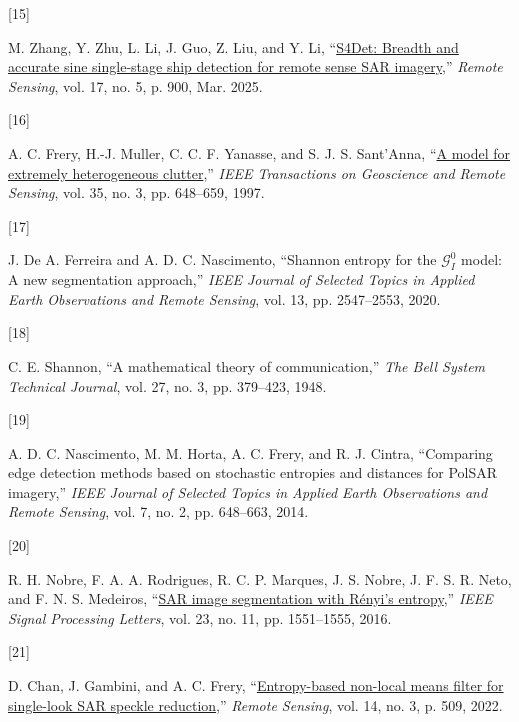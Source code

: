 \documentclass[
  lettersize  journal,
]{IEEEtran}%
\newlength{\cslhangindent}
\newlength{\csllabelwidth}
\newenvironment{CSLReferences}[2] %
 {\begin{list}{}{%
  \setlength{\itemindent}{0pt}
  \setlength{\leftmargin}{0pt}
  \setlength{\parsep}{0pt}
  \ifodd #1
   \setlength{\leftmargin}{\cslhangindent}
   \setlength{\itemindent}{-1\cslhangindent}
  \fi
  \setlength{\itemsep}{#2\baselineskip}}}
 {\end{list}}
\newcommand{\CSLLeftMargin}[1]{\parbox[t]{\csllabelwidth}{\strut#1\strut}}
\newcommand{\CSLRightInline}[1]{\parbox[t]{\linewidth - \csllabelwidth}{\strut#1\strut}}
\begin{document}
\begin{CSLReferences}{0}{0}
\CSLLeftMargin{{[}15{]} }%
\CSLRightInline{M. Zhang, Y. Zhu, L. Li, J. Guo, Z. Liu, and Y. Li,
{``\href{https://doi.org/10.3390/rs17050900}{{S4Det}: Breadth and
accurate sine single-stage ship detection for remote sense {SAR}
imagery},''} \emph{Remote Sensing}, vol. 17, no. 5, p. 900, Mar. 2025. }

\CSLLeftMargin{{[}16{]} }%
\CSLRightInline{A. C. Frery, H.-J. Muller, C. C. F. Yanasse, and S. J.
S. Sant'Anna, {``\href{https://doi.org/10.1109/36.581981}{A model for
extremely heterogeneous clutter},''} \emph{{IEEE} Transactions on
Geoscience and Remote Sensing}, vol. 35, no. 3, pp. 648--659, 1997. }

\CSLLeftMargin{{[}17{]} }%
\CSLRightInline{J. De A. Ferreira and A. D. C. Nascimento, {``Shannon
entropy for the {\(\mathcal {G}^0_{I}\)} model: A new segmentation
approach,''} \emph{{IEEE} Journal of Selected Topics in Applied Earth
Observations and Remote Sensing}, vol. 13, pp. 2547--2553, 2020. }

\CSLLeftMargin{{[}18{]} }%
\CSLRightInline{C. E. Shannon, {``A mathematical theory of
communication,''} \emph{The Bell System Technical Journal}, vol. 27, no.
3, pp. 379--423, 1948. }

\CSLLeftMargin{{[}19{]} }%
\CSLRightInline{A. D. C. Nascimento, M. M. Horta, A. C. Frery, and R. J.
Cintra, {``Comparing edge detection methods based on stochastic
entropies and distances for {PolSAR} imagery,''} \emph{{IEEE} Journal of
Selected Topics in Applied Earth Observations and Remote Sensing}, vol.
7, no. 2, pp. 648--663, 2014. }

\CSLLeftMargin{{[}20{]} }%
\CSLRightInline{R. H. Nobre, F. A. A. Rodrigues, R. C. P. Marques, J. S.
Nobre, J. F. S. R. Neto, and F. N. S. Medeiros,
{``\href{https://doi.org/10.1109/lsp.2016.2606760}{SAR image
segmentation with {R}ényi's entropy},''} \emph{IEEE Signal Processing
Letters}, vol. 23, no. 11, pp. 1551--1555, 2016. }

\CSLLeftMargin{{[}21{]} }%
\CSLRightInline{D. Chan, J. Gambini, and A. C. Frery,
{``\href{https://doi.org/10.3390/rs14030509}{Entropy-based non-local
means filter for single-look SAR speckle reduction},''} \emph{Remote
Sensing}, vol. 14, no. 3, p. 509, 2022. }


\end{CSLReferences}
\end{document}
